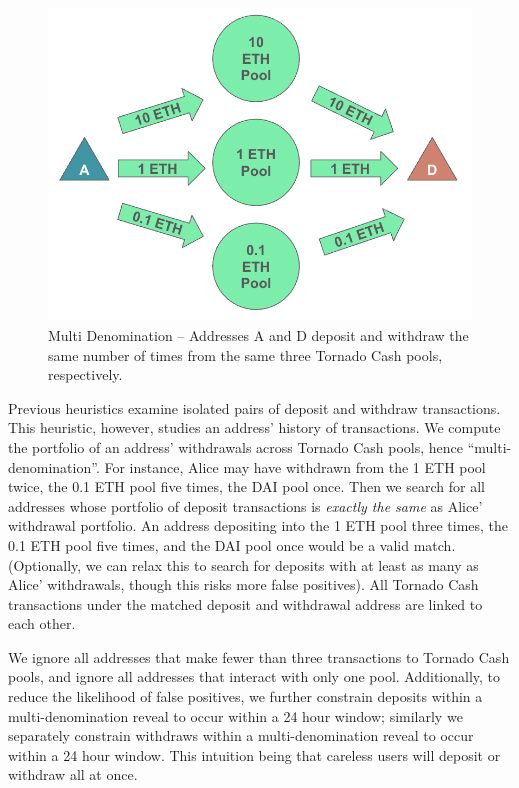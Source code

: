 \begin{figure}[h!]
\centering
\includegraphics[width=0.6\linewidth]{figures/tcash/h4.png}
\caption{Multi Denomination -- Addresses A and D deposit and withdraw the same number of times from the same three Tornado Cash pools, respectively.}
\label{fig:tornado}
\end{figure}

Previous heuristics examine isolated pairs of deposit and withdraw transactions. This heuristic, however, studies an address' history of transactions. We compute the portfolio of an address' withdrawals across Tornado Cash pools, hence ``multi-denomination''. For instance, Alice may have withdrawn from the 1 ETH pool twice, the 0.1 ETH pool five times, the DAI pool once. Then we search for all addresses whose portfolio of deposit transactions is \textit{exactly the same} as Alice' withdrawal portfolio. An address depositing into the 1 ETH pool three times, the 0.1 ETH pool five times, and the DAI pool once would be a valid match. (Optionally, we can relax this to search for deposits with at least as many as Alice' withdrawals, though this risks more false positives). All Tornado Cash transactions under the matched deposit and withdrawal address are linked to each other.

We ignore all addresses that make fewer than three transactions to Tornado Cash pools, and ignore all addresses that interact with only one pool. Additionally, to reduce the likelihood of false positives, we further constrain deposits within a multi-denomination reveal to occur within a 24 hour window; similarly we separately constrain withdraws within a multi-denomination reveal to occur within a 24 hour window. This intuition being that careless users will deposit or withdraw all at once.

